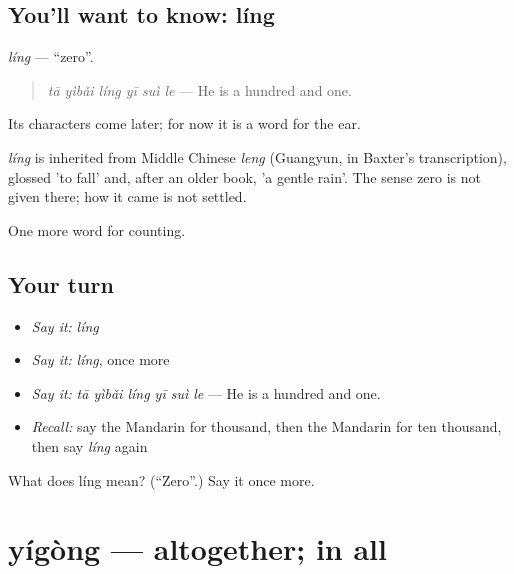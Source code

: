 \subsection*{You'll want to know: líng}
\emph{líng} — \textquotedblleft{}zero\textquotedblright{}.

\begin{quote}
\emph{tā yìbǎi líng yī suì le} — He is a hundred and one.
\end{quote}

Its characters come later; for now it is a word for the ear.

\begin{cousinweb}
\emph{líng} is inherited from Middle Chinese \emph{leng} (Guangyun, in Baxter's transcription), glossed 'to fall' and, after an older book, 'a gentle rain'. The sense zero is not given there; how it came is not settled.
\end{cousinweb}

\begin{grammarlens}[title={What you've built}]
One more word for counting.
\end{grammarlens}

\subsection*{Your turn}
\begin{itemize}
\raggedright
  \item \emph{Say it:} \emph{líng}
  \item \emph{Say it:} \emph{líng}, once more
  \item \emph{Say it:} \emph{tā yìbǎi líng yī suì le} — He is a hundred and one.
  \item \emph{Recall:} say the Mandarin for thousand, then the Mandarin for ten thousand, then say \emph{líng} again
\end{itemize}

\begin{tcolorbox}[breakable,colback=teal!4,colframe=teal!35!black,title={Before you move on}]
What does líng mean? (\textquotedblleft{}Zero\textquotedblright{}.) Say it once more.
\end{tcolorbox}
\section[yígòng]{yígòng — altogether; in all}

\label{lesson:ZH-C132-yigong}



